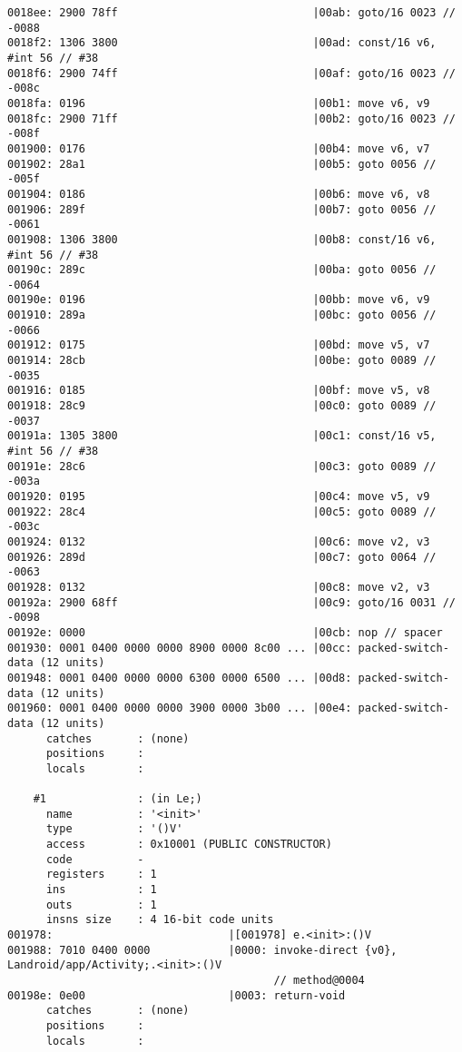 \begin{lstlisting}
0018ee: 2900 78ff                              |00ab: goto/16 0023 // -0088
0018f2: 1306 3800                              |00ad: const/16 v6, #int 56 // #38
0018f6: 2900 74ff                              |00af: goto/16 0023 // -008c
0018fa: 0196                                   |00b1: move v6, v9
0018fc: 2900 71ff                              |00b2: goto/16 0023 // -008f
001900: 0176                                   |00b4: move v6, v7
001902: 28a1                                   |00b5: goto 0056 // -005f
001904: 0186                                   |00b6: move v6, v8
001906: 289f                                   |00b7: goto 0056 // -0061
001908: 1306 3800                              |00b8: const/16 v6, #int 56 // #38
00190c: 289c                                   |00ba: goto 0056 // -0064
00190e: 0196                                   |00bb: move v6, v9
001910: 289a                                   |00bc: goto 0056 // -0066
001912: 0175                                   |00bd: move v5, v7
001914: 28cb                                   |00be: goto 0089 // -0035
001916: 0185                                   |00bf: move v5, v8
001918: 28c9                                   |00c0: goto 0089 // -0037
00191a: 1305 3800                              |00c1: const/16 v5, #int 56 // #38
00191e: 28c6                                   |00c3: goto 0089 // -003a
001920: 0195                                   |00c4: move v5, v9
001922: 28c4                                   |00c5: goto 0089 // -003c
001924: 0132                                   |00c6: move v2, v3
001926: 289d                                   |00c7: goto 0064 // -0063
001928: 0132                                   |00c8: move v2, v3
00192a: 2900 68ff                              |00c9: goto/16 0031 // -0098
00192e: 0000                                   |00cb: nop // spacer
001930: 0001 0400 0000 0000 8900 0000 8c00 ... |00cc: packed-switch-data (12 units)
001948: 0001 0400 0000 0000 6300 0000 6500 ... |00d8: packed-switch-data (12 units)
001960: 0001 0400 0000 0000 3900 0000 3b00 ... |00e4: packed-switch-data (12 units)
      catches       : (none)
      positions     :
      locals        :

    #1              : (in Le;)
      name          : '<init>'
      type          : '()V'
      access        : 0x10001 (PUBLIC CONSTRUCTOR)
      code          -
      registers     : 1
      ins           : 1
      outs          : 1
      insns size    : 4 16-bit code units
001978:                           |[001978] e.<init>:()V
001988: 7010 0400 0000            |0000: invoke-direct {v0}, Landroid/app/Activity;.<init>:()V
                                         // method@0004
00198e: 0e00                      |0003: return-void
      catches       : (none)
      positions     :
      locals        :


\end{lstlisting}
